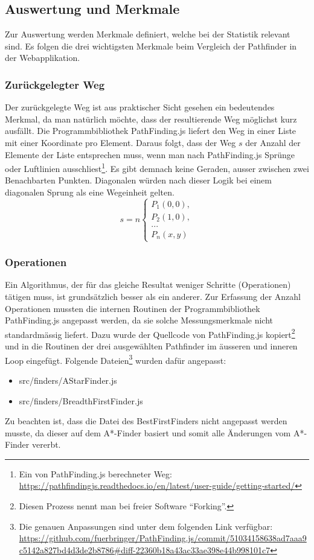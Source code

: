 \subsection{Auswertung und Merkmale}
Zur Auswertung werden Merkmale definiert, welche bei der Statistik relevant sind. Es folgen die drei wichtigsten Merkmale beim Vergleich der Pathfinder in der Webapplikation.
\subsubsection{Zurückgelegter Weg}
Der zurückgelegte Weg ist aus praktischer Sicht gesehen ein bedeutendes Merkmal, da man natürlich möchte, dass der resultierende Weg möglichst kurz ausfällt. 
Die Programmbibliothek PathFinding.js liefert den Weg in einer Liste mit einer Koordinate pro Element.
Daraus folgt, dass der Weg $s$ der Anzahl der Elemente der Liste entsprechen muss, wenn man nach PathFinding.js Sprünge oder Luftlinien ausschliest\footnote{Ein von PathFinding.js berechneter Weg: \url{https://pathfindingjs.readthedocs.io/en/latest/user-guide/getting-started/}}. 
Es gibt demnach keine Geraden, ausser zwischen zwei Benachbarten Punkten.
Diagonalen würden nach dieser Logik bei einem diagonalen Sprung als eine Wegeinheit gelten.
\[ s = n
\begin{cases}
  P_1(0,0),\\
  P_2(1,0),\\
  ...\\
  P_n(x,y)
\end{cases}
\]
\subsubsection{Operationen}
Ein Algorithmus, der für das gleiche Resultat weniger Schritte (Operationen) tätigen muss, ist grundsätzlich besser als ein anderer. Zur Erfassung der Anzahl Operationen mussten die internen Routinen der Programmbibliothek PathFinding.js angepasst werden, da sie solche Messungsmerkmale nicht standardmässig liefert. Dazu wurde der Quellcode von PathFinding.js kopiert\footnote{Diesen Prozess nennt man bei freier Software ``Forking''.} und in die Routinen der drei ausgewählten Pathfinder im äusseren und inneren Loop eingefügt. Folgende Dateien\footnote{Die genauen Anpassungen sind unter dem folgenden Link verfügbar: \url{https://github.com/fuerbringer/PathFinding.js/commit/51034158638ad7aaa9c5142a827bd4d3de2b8786\#diff-22360b18a43ac33ae398e44b998101c7}} wurden dafür angepasst:
\begin{itemize}
\item{src/finders/AStarFinder.js}
\item{src/finders/BreadthFirstFinder.js}
\end{itemize}
Zu beachten ist, dass die Datei des BestFirstFinders nicht angepasst werden musste, da dieser auf dem A*-Finder basiert und somit alle Änderungen vom A*-Finder vererbt.
